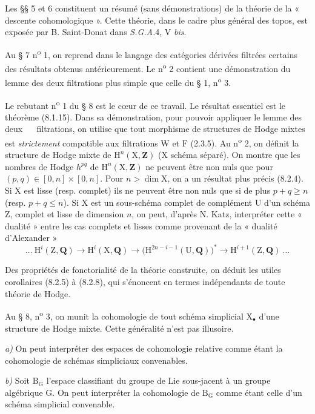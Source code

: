 \documentclass[11pt,leqno]{article}
\newcommand{\Page}[1]{\ifvmode\noindent\else\unskip\ \fi{\footnotesize\textcolor{gray}{[p.\,#1]}}\ \ignorespaces}
\begin{document}
Les §§ 5 et 6 constituent un résumé (sans démonstrations) de la théorie de la « descente cohomologique ». Cette théorie, dans le cadre plus général des topos, est exposée par B. Saint-Donat dans \textit{S.G.A.}4, V \textit{bis}.

Au § 7 n\textsuperscript{o} 1, on reprend dans le langage des catégories dérivées filtrées certains des résultats obtenus antérieurement. Le n\textsuperscript{o} 2 contient une démonstration du lemme des deux filtrations plus simple que celle du § 1, n\textsuperscript{o} 3.

Le rebutant n\textsuperscript{o} 1 du § 8 est le cœur de ce travail. Le résultat essentiel est le théorème (8.1.15). Dans sa démonstration, pour pouvoir appliquer le lemme des deux
\Page{7}
filtrations, on utilise que tout morphisme de structures de Hodge mixtes est \textit{strictement} compatible aux filtrations \(\mathrm{W}\) et \(\mathrm{F}\) (2.3.5). Au n\textsuperscript{o} 2, on définit la structure de Hodge mixte de \(\mathrm{H}^n(\mathrm{X},\mathbf{Z})\) (\(\mathrm{X}\) schéma séparé). On montre que les nombres de Hodge \(h^{pq}\) de \(\mathrm{H}^n(\mathrm{X},\mathbf{Z})\) ne peuvent être non nuls que pour \((p,q)\in[0,n]\times[0,n]\). Pour \(n>\dim\mathrm{X}\), on a un résultat plus précis (8.2.4). Si \(\mathrm{X}\) est lisse (resp. complet) ils ne peuvent être non nuls que si de plus \(p+q\geq n\) (resp. \(p+q\leq n\)). Si \(\mathrm{X}\) est un sous-schéma complet de complément \(\mathrm{U}\) d’un schéma \(\mathrm{Z}\), complet et lisse de dimension \(n\), on peut, d’après N. Katz, interpréter cette « dualité » entre les cas complets et lisses comme provenant de la « dualité d’Alexander »
\[
\ldots\ \mathrm{H}^i(\mathrm{Z},\mathbf{Q})
\to \mathrm{H}^i(\mathrm{X},\mathbf{Q})
\to \bigl(\mathrm{H}^{2n-i-1}(\mathrm{U},\mathbf{Q})\bigr)^*
\to \mathrm{H}^{i+1}(\mathrm{Z},\mathbf{Q})\ \ldots
\]

Des propriétés de fonctorialité de la théorie construite, on déduit les utiles corollaires (8.2.5) à (8.2.8), qui s’énoncent en termes indépendants de toute théorie de Hodge.

Au § 8, n\textsuperscript{o} 3, on munit la cohomologie de tout schéma simplicial \(\mathrm{X}_{\bullet}\) d’une structure de Hodge mixte. Cette généralité n’est pas illusoire.

\textit{a)} On peut interpréter des espaces de cohomologie relative comme étant la cohomologie de schémas simpliciaux convenables.

\textit{b)} Soit \(\mathrm{B}_{\mathrm{G}}\) l’espace classifiant du groupe de Lie sous-jacent à un groupe algébrique \(\mathrm{G}\). On peut interpréter la cohomologie de \(\mathrm{B}_{\mathrm{G}}\) comme étant celle d’un schéma simplicial convenable.
\end{document}
